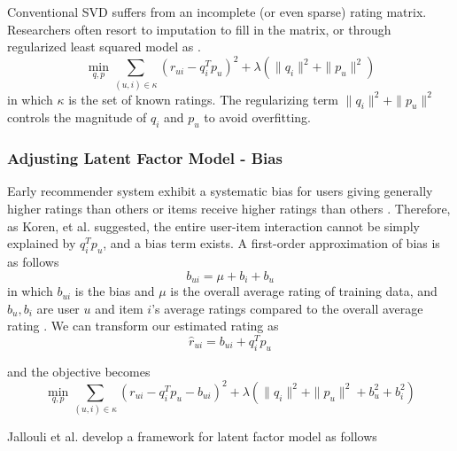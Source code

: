 \documentclass[letter paper, 11pt]{article}
\begin{document}
	
	Conventional SVD suffers from an incomplete (or even sparse) rating matrix. Researchers often resort to imputation to fill in the matrix, or through regularized least squared model as \cite{MFinRS}.
	\begin{equation}
		\min_{q, p} \sum_{(u, i) \in \kappa} (r_{ui} - q_i^T p_u)^2 + \lambda(\|q_i\|^2 + \|p_u\|^2)
	\end{equation}
	in which $\kappa$ is the set of known ratings. The regularizing term $\|q_i\|^2 + \|p_u\|^2$ controls the magnitude of $q_i$ and $p_u$ to avoid overfitting.
	
	\subsubsection{Adjusting Latent Factor Model - Bias}
	Early recommender system exhibit a systematic bias for users giving generally higher ratings than others or items receive higher ratings than others \cite{MFinRS}. Therefore, as Koren, et al. suggested, the entire user-item interaction cannot be simply explained by $q_i^T  p_u$, and a bias term exists. A first-order approximation of bias is as follows \cite{MFinRS}
	\begin{equation}
		b_{ui} = \mu + b_i + b_u
	\end{equation}
	in which $b_{ui}$ is the bias and $\mu$ is the overall average rating of training data, and $b_u, b_i$ are user $u$ and item $i$'s average ratings compared to the overall average rating \cite{MFinRS}. We can transform our estimated rating as 
	\begin{equation}
		\hat{r}_{ui} = b_{ui} + q_i^T  p_u 
	\end{equation}
	
	and the objective becomes
	\begin{equation}
		\min_{q, p} \sum_{(u, i) \in \kappa} (r_{ui} - q_i^T p_u - b_{ui})^2 + \lambda(\|q_i\|^2 + \|p_u\|^2 + b_u^2 + b_i^2)
	\end{equation}
	
	Jallouli et al. develop a framework for latent factor model \cite{latentFactor-RS} as follows
	
\end{document}
